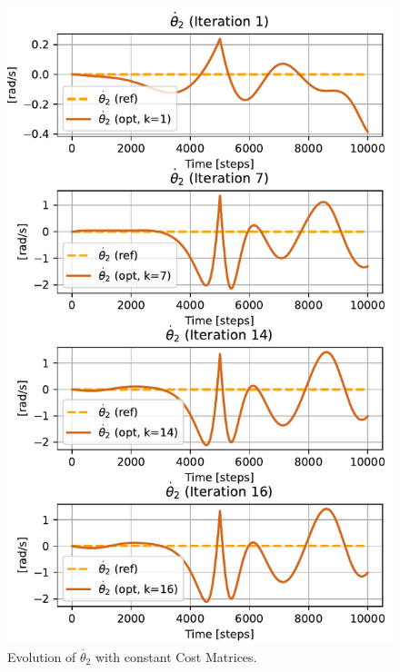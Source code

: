 \begin{figure}[htb]
    \centering
    \includegraphics[width=1\linewidth]{img/1-Task1/th2dot_const.pdf}
    \caption{Evolution of $\dot{\theta_2}$ with constant Cost Matrices.}
    \label{fig:th2_const}
\end{figure}

